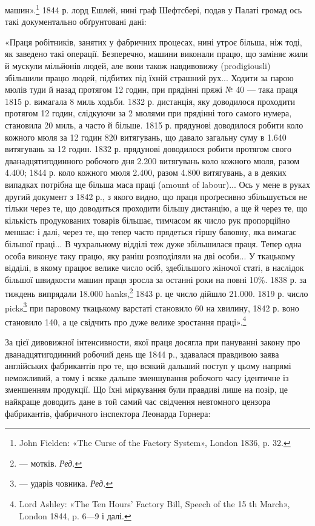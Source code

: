 машин».\footnote{
John Fielden: «The Curse of the Factory System», London
1836, p. 32.
} 1844 р. лорд Ешлей, нині граф Шефтсбері, подав
у Палаті громад ось такі документально обґрунтовані дані:

«Праця робітників, занятих у фабричних процесах, нині утроє
більша, ніж тоді, як заведено такі операції. Безперечно, машини
виконали працю, що заміняє жили й мускули мільйонів людей,
але вони також навдивовижу (prodigiousli) збільшили працю
людей, підбитих під їхній страшний рух... Ходити за парою
мюлів туди й назад протягом 12 годин, при прядінні пряжі
№ 40 — така праця 1815 р. вимагала 8 миль ходьби. 1832 р.
дистанція, яку доводилося проходити протягом 12 годин, слідкуючи
за 2 мюлями при прядінні того самого нумера, становила
20 миль, а часто й більше. 1815 р. прядунові доводилося робити
коло кожного мюля за 12 годин 820 витягувань, що давало загальну
суму в 1.640 витягувань за 12 годин. 1832 р. прядунові
доводилося робити протягом свого дванадцятигодинного робочого
дня 2.200 витягувань коло кожного мюля, разом 4.400; 1844 р.
коло кожного мюля 2.400, разом 4.800 витягувань, а в деяких
випадках потрібна ще більша маса праці (amount of labour)...
Ось у мене в руках другий документ з 1842 р., з якого видно,
що праця проґресивно збільшується не тільки через те, що доводиться
проходити більшу дистанцію, а ще й через те, що кількість
продукованих товарів більшає, тимчасом як число рук пропорційно
меншає: і далі, через те, що тепер часто прядеться гіршу
бавовну, яка вимагає більшої праці... В чухральному відділі
теж дуже збільшилася праця. Тепер одна особа виконує таку
працю, яку раніш розподіляли на дві особи... У ткацькому відділі,
в якому працює велике число осіб, здебільшого жіночої
статі, в наслідок більшої швидкости машин праця зросла за
останні роки на повні 10\%. 1838 р. за тиждень випрядали 18.000
hanks,\footnote*{
— мотків. \emph{Ред.}
} 1843 р. це число дійшло 21.000. 1819 р. число picks\footnote*{
— ударів човника. \emph{Ред.}
}
при паровому ткацькому варстаті становило 60 на хвилину, 1842 р.
воно становило 140, а це свідчить про дуже велике зростання
праці».\footnote{
Lord Ashley: «The Ten Hours’ Factory Bill, Speech of the 15 th
March», London 1844, p. 6—9 і далі.
}

За цієї дивовижної інтенсивности, якої праця досягла при пануванні
закону про дванадцятигодинний робочий день ще 1844 р.,
здавалася правдивою заява англійських фабрикантів про те,
що всякий дальший поступ у цьому напрямі неможливий, а
тому і всяке дальше зменшування робочого часу ідентичне із
зменшенням продукції. Що їхні міркування були правдиві лише
на позір, це найкраще доводить дане в той самий час свідчення
невтомного цензора фабрикантів, фабричного інспектора Леонарда
Горнера: